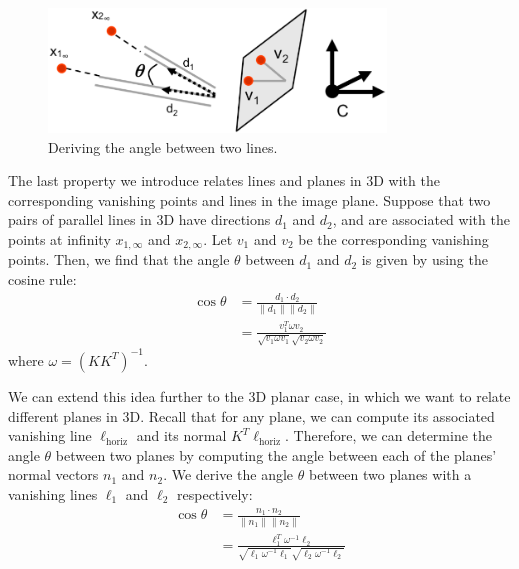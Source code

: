 \documentclass[a4paper, 12pt]{article}
\begin{document}
\begin{figure}[h!]
\centering
\includegraphics[width=0.8\textwidth]{figures/angles.png}
\caption{Deriving the angle between two lines.}
\label{fig:angles}
\end{figure}

The last property we introduce relates lines and planes in 3D with the corresponding vanishing points and lines in the image plane. Suppose that two pairs of parallel lines in 3D have directions $d_1$ and $d_2$, and are associated with the points at infinity $x_{1,\infty}$ and $x_{2,\infty}$. Let $v_1$ and $v_2$ be the corresponding vanishing points. Then, we find that the angle $\theta$ between $d_1$ and $d_2$ is given by using the cosine rule:
\begin{equation}
    \begin{split}
        \cos\theta &= \frac{d_1 \cdot d_2}{\|d_1\| \|d_2\|}\\
        &= \frac{v_1^T\omega v_2}{\sqrt{v_1 \omega v_1}\sqrt{v_2 \omega v_2}}
    \end{split}
    \label{eq:angles}
\end{equation}
where $\omega = (KK^T)^{-1}$. 

We can extend this idea further to the 3D planar case, in which we want to relate different planes in 3D. Recall that for any plane, we can compute its associated vanishing line $\ell_\mathrm{{horiz}}$ and its normal $K^T \ell_{\mathrm{horiz}}$. Therefore, we can determine the angle $\theta$ between two planes by computing the angle between each of the planes' normal vectors $n_1$ and $n_2$. We derive the angle $\theta$ between two planes with a vanishing lines $\ell_1$ and $\ell_2$ respectively:
\begin{equation}
    \begin{split}
        \cos\theta &= \frac{n_1 \cdot n_2}{\|n_1\| \|n_2\|}\\
        &= \frac{\ell_1^T\omega^{-1} \ell_2}{\sqrt{\ell_1 \omega^{-1} \ell_1}\sqrt{\ell_2 \omega^{-1} \ell_2}}
    \end{split}
\end{equation}
\end{document}
